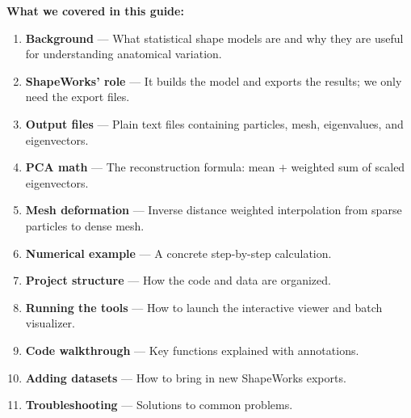 \documentclass[12pt,a4paper]{article}
\begin{document}
\begin{mdframed}[backgroundcolor=codegray, linecolor=shapeworksblue, linewidth=1.5pt]
\textbf{What we covered in this guide:}
\begin{enumerate}[itemsep=0.3em]
    \item \textbf{Background} --- What statistical shape models are and why they are useful for understanding anatomical variation.
    \item \textbf{ShapeWorks' role} --- It builds the model and exports the results; we only need the export files.
    \item \textbf{Output files} --- Plain text files containing particles, mesh, eigenvalues, and eigenvectors.
    \item \textbf{PCA math} --- The reconstruction formula: mean $+$ weighted sum of scaled eigenvectors.
    \item \textbf{Mesh deformation} --- Inverse distance weighted interpolation from sparse particles to dense mesh.
    \item \textbf{Numerical example} --- A concrete step-by-step calculation.
    \item \textbf{Project structure} --- How the code and data are organized.
    \item \textbf{Running the tools} --- How to launch the interactive viewer and batch visualizer.
    \item \textbf{Code walkthrough} --- Key functions explained with annotations.
    \item \textbf{Adding datasets} --- How to bring in new ShapeWorks exports.
    \item \textbf{Troubleshooting} --- Solutions to common problems.
\end{enumerate}
\end{mdframed}
\end{document}
